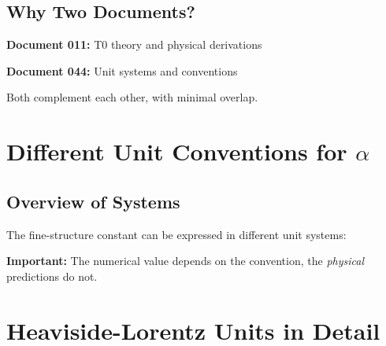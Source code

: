 	\subsection{Why Two Documents?}
	
	\textbf{Document 011:} T0 theory and physical derivations
	
	\textbf{Document 044:} Unit systems and conventions
	
	Both complement each other, with minimal overlap.
	
	\section{Different Unit Conventions for $\alpha$}
	
	\subsection{Overview of Systems}
	
	The fine-structure constant can be expressed in different unit systems:
	
	\begin{table}[h]
		\centering
		\caption{Unit systems for $\alpha$}
	\end{table}
	
	\textbf{Important:} The numerical value depends on the convention, the \textit{physical} predictions do not.
	
	\section[Heaviside-Lorentz Units in Detail]{Heaviside-Lorentz Units in Detail}
	
